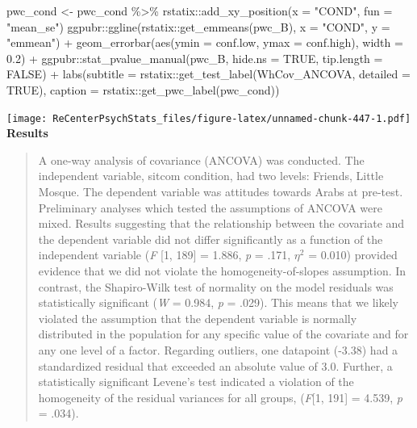 \documentclass[
  11pt,
]{book}
\newenvironment{Shaded}{\begin{snugshade}}{\end{snugshade}}
\newcommand{\AttributeTok}[1]{\textcolor[rgb]{0.77,0.63,0.00}{#1}}
\newcommand{\ConstantTok}[1]{\textcolor[rgb]{0.00,0.00,0.00}{#1}}
\newcommand{\FloatTok}[1]{\textcolor[rgb]{0.00,0.00,0.81}{#1}}
\newcommand{\FunctionTok}[1]{\textcolor[rgb]{0.00,0.00,0.00}{#1}}
\newcommand{\NormalTok}[1]{#1}
\newcommand{\OtherTok}[1]{\textcolor[rgb]{0.56,0.35,0.01}{#1}}
\newcommand{\SpecialCharTok}[1]{\textcolor[rgb]{0.00,0.00,0.00}{#1}}
\newcommand{\StringTok}[1]{\textcolor[rgb]{0.31,0.60,0.02}{#1}}
\begin{document}
\begin{Shaded}
\begin{Highlighting}[]
\NormalTok{pwc\_cond }\OtherTok{\textless{}{-}}\NormalTok{ pwc\_cond }\SpecialCharTok{\%\textgreater{}\%}
\NormalTok{    rstatix}\SpecialCharTok{::}\FunctionTok{add\_xy\_position}\NormalTok{(}\AttributeTok{x =} \StringTok{"COND"}\NormalTok{, }\AttributeTok{fun =} \StringTok{"mean\_se"}\NormalTok{)}
\NormalTok{ggpubr}\SpecialCharTok{::}\FunctionTok{ggline}\NormalTok{(rstatix}\SpecialCharTok{::}\FunctionTok{get\_emmeans}\NormalTok{(pwc\_B), }\AttributeTok{x =} \StringTok{"COND"}\NormalTok{, }\AttributeTok{y =} \StringTok{"emmean"}\NormalTok{) }\SpecialCharTok{+}
    \FunctionTok{geom\_errorbar}\NormalTok{(}\FunctionTok{aes}\NormalTok{(}\AttributeTok{ymin =}\NormalTok{ conf.low, }\AttributeTok{ymax =}\NormalTok{ conf.high), }\AttributeTok{width =} \FloatTok{0.2}\NormalTok{) }\SpecialCharTok{+}
\NormalTok{    ggpubr}\SpecialCharTok{::}\FunctionTok{stat\_pvalue\_manual}\NormalTok{(pwc\_B, }\AttributeTok{hide.ns =} \ConstantTok{TRUE}\NormalTok{, }\AttributeTok{tip.length =} \ConstantTok{FALSE}\NormalTok{) }\SpecialCharTok{+}
    \FunctionTok{labs}\NormalTok{(}\AttributeTok{subtitle =}\NormalTok{ rstatix}\SpecialCharTok{::}\FunctionTok{get\_test\_label}\NormalTok{(WhCov\_ANCOVA, }\AttributeTok{detailed =} \ConstantTok{TRUE}\NormalTok{),}
        \AttributeTok{caption =}\NormalTok{ rstatix}\SpecialCharTok{::}\FunctionTok{get\_pwc\_label}\NormalTok{(pwc\_cond))}
\end{Highlighting}
\end{Shaded}

\texttt{[image: ReCenterPsychStats\_files/figure-latex/unnamed-chunk-447-1.pdf]}
\textbf{Results}

\begin{quote}
A one-way analysis of covariance (ANCOVA) was conducted. The independent variable, sitcom condition, had two levels: Friends, Little Mosque. The dependent variable was attitudes towards Arabs at pre-test. Preliminary analyses which tested the assumptions of ANCOVA were mixed. Results suggesting that the relationship between the covariate and the dependent variable did not differ significantly as a function of the independent variable (\emph{F} {[}1, 189{]} = 1.886, \emph{p} = .171, \(\eta^2\) = 0.010) provided evidence that we did not violate the homogeneity-of-slopes assumption. In contrast, the Shapiro-Wilk test of normality on the model residuals was statistically significant (\emph{W} = 0.984, \emph{p} = .029). This means that we likely violated the assumption that the dependent variable is normally distributed in the population for any specific value of the covariate and for any one level of a factor. Regarding outliers, one datapoint (-3.38) had a standardized residual that exceeded an absolute value of 3.0. Further, a statistically significant Levene's test indicated a violation of the homogeneity of the residual variances for all groups, (\emph{F}{[}1, 191{]} = 4.539, \emph{p} = .034).
\end{quote}
\end{document}
